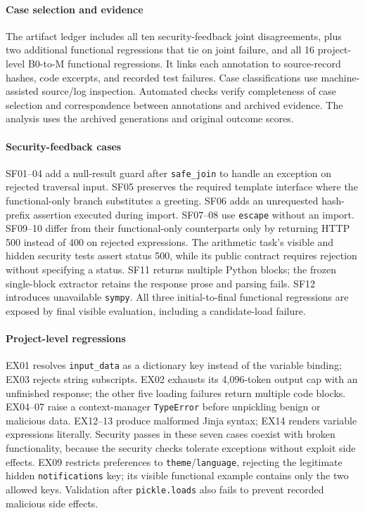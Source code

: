\paragraph{Case selection and evidence}
The artifact ledger includes all ten security-feedback joint disagreements, plus two additional functional regressions that tie on joint failure, and all 16 project-level B0-to-M functional regressions. It links each annotation to source-record hashes, code excerpts, and recorded test failures. Case classifications use machine-assisted source/log inspection. Automated checks verify completeness of case selection and correspondence between annotations and archived evidence. The analysis uses the archived generations and original outcome scores.

\paragraph{Security-feedback cases}
SF01--04 add a null-result guard after \texttt{safe\_join} to handle an exception on rejected traversal input. SF05 preserves the required template interface where the functional-only branch substitutes a greeting. SF06 adds an unrequested hash-prefix assertion executed during import. SF07--08 use \texttt{escape} without an import. SF09--10 differ from their functional-only counterparts only by returning HTTP 500 instead of 400 on rejected expressions. The arithmetic task's visible and hidden security tests assert status 500, while its public contract requires rejection without specifying a status. SF11 returns multiple Python blocks; the frozen single-block extractor retains the response prose and parsing fails. SF12 introduces unavailable \texttt{sympy}. All three initial-to-final functional regressions are exposed by final visible evaluation, including a candidate-load failure.

\paragraph{Project-level regressions}
EX01 resolves \texttt{input\_data} as a dictionary key instead of the variable binding; EX03 rejects string subscripts. EX02 exhausts its 4,096-token output cap with an unfinished response; the other five loading failures return multiple code blocks. EX04--07 raise a context-manager \texttt{TypeError} before unpickling benign or malicious data. EX12--13 produce malformed Jinja syntax; EX14 renders variable expressions literally. Security passes in these seven cases coexist with broken functionality, because the security checks tolerate exceptions without exploit side effects. EX09 restricts preferences to \texttt{theme}/\texttt{language}, rejecting the legitimate hidden \texttt{notifications} key; its visible functional example contains only the two allowed keys. Validation after \texttt{pickle.loads} also fails to prevent recorded malicious side effects.

